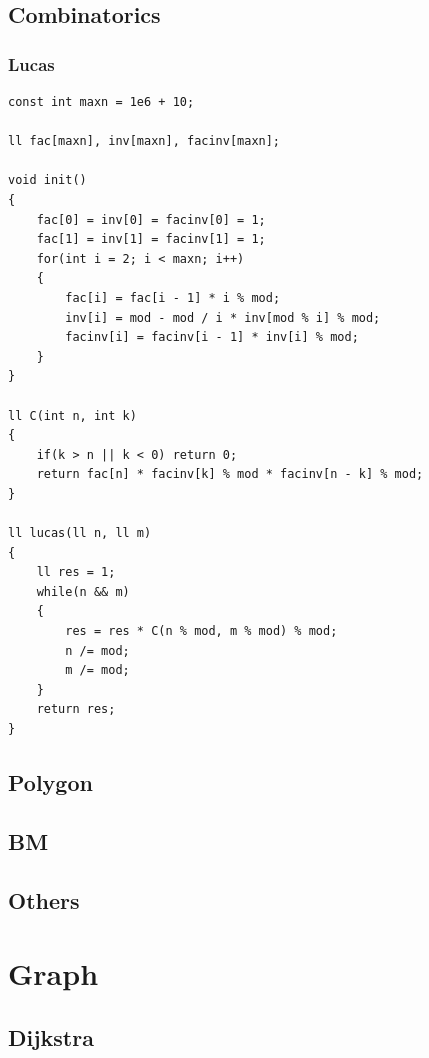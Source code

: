 \documentclass[twoside]{article}
\begin{document}
\subsection{Combinatorics}
\subsubsection{Lucas}
\begin{lstlisting}
const int maxn = 1e6 + 10;

ll fac[maxn], inv[maxn], facinv[maxn];

void init()
{
    fac[0] = inv[0] = facinv[0] = 1;
    fac[1] = inv[1] = facinv[1] = 1;
    for(int i = 2; i < maxn; i++)
    {
        fac[i] = fac[i - 1] * i % mod;
        inv[i] = mod - mod / i * inv[mod % i] % mod;
        facinv[i] = facinv[i - 1] * inv[i] % mod;
    }
}

ll C(int n, int k)
{
    if(k > n || k < 0) return 0;
    return fac[n] * facinv[k] % mod * facinv[n - k] % mod;
}

ll lucas(ll n, ll m)
{
    ll res = 1;
    while(n && m)
    {
        res = res * C(n % mod, m % mod) % mod;
        n /= mod;
        m /= mod;
    }
    return res;
}\end{lstlisting}
\subsection{Polygon}
\subsection{BM}
\subsection{Others}
\clearpage\section{Graph}
\subsection{Dijkstra}
\end{document}
